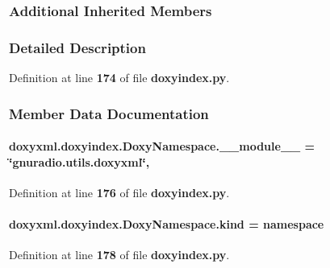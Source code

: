 \subsubsection*{Additional Inherited Members}


\subsubsection{Detailed Description}


Definition at line {\bf 174} of file {\bf doxyindex.\+py}.



\subsubsection{Member Data Documentation}
\paragraph[{\+\_\+\+\_\+module\+\_\+\+\_\+}]{ doxyxml.\+doxyindex.\+Doxy\+Namespace.\+\_\+\+\_\+module\+\_\+\+\_\+ = \char`\"{}gnuradio.\+utils.\+doxyxml\char`\"{}\hspace{0.3cm}{\ttfamily [static]}, {\ttfamily [private]}}\label{classdoxyxml_1_1doxyindex_1_1DoxyNamespace_af3eb39d238c464fc2e907a4a1fe5fe69}


Definition at line {\bf 176} of file {\bf doxyindex.\+py}.

\paragraph[{kind}]{ doxyxml.\+doxyindex.\+Doxy\+Namespace.\+kind = \textquotesingle{}namespace\textquotesingle{}\hspace{0.3cm}{\ttfamily [static]}}\label{classdoxyxml_1_1doxyindex_1_1DoxyNamespace_a6613dd4fb7ebe3f788f324e7a011d5ba}


Definition at line {\bf 178} of file {\bf doxyindex.\+py}.



